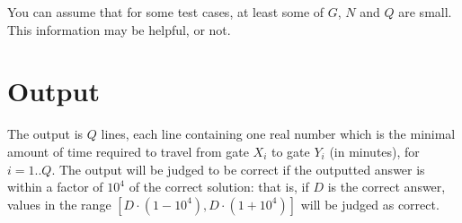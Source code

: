You can assume that for some test cases, at least some of $G$, $N$ and $Q$ are small. This information may be helpful, or not.

\section*{Output}

The output is $Q$ lines, each line containing one real number which is the minimal amount of time required to travel from gate $X_i$ to gate $Y_i$ (in minutes), for $i = 1..Q$. The output will be judged to be correct if the outputted answer is within a factor of $10^4$ of the correct solution: that is, if $D$ is the correct answer, values in the range $[D \cdot (1-10^4), D \cdot (1 + 10^4)]$ will be judged as correct.